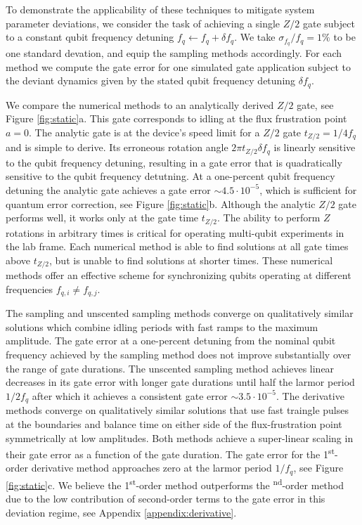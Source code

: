 To demonstrate the applicability of these techniques
to mitigate system parameter deviations,
we consider the task of achieving a single $Z/2$
gate subject to a constant qubit frequency detuning
$f_{q} \gets f_{q} + \delta f_{q}$.
We take $\sigma_{f_{q}} / f_{q} = 1\%$ to be one standard devation, and equip
the sampling methods accordingly. For each method we compute the gate error for
one simulated gate application subject to the deviant dynamics given by the
stated qubit frequency detuning $\delta f_{q}$.

We compare the numerical methods
to an analytically derived $Z/2$ gate, see Figure \ref{fig:static}a. This gate corresponds to
idling at the flux frustration point $a = 0$. The analytic gate
is at the device's speed limit for a $Z/2$ gate $t_{Z/2} = 1 / 4 f_{q}$ and
is simple to derive. Its erroneous rotation angle $2 \pi t_{Z/2} \delta f_{q}$ is linearly sensitive to
the qubit frequency detuning, resulting in a gate error that is quadratically sensitive
to the qubit frequency detutning.
At a one-percent
qubit frequency detuning the analytic gate achieves a gate error $\sim 4.5 \cdot 10^{-5}$,
which is sufficient for quantum error correction, see Figure \ref{fig:static}b.
Although the analytic $Z/2$ gate performs well, it works
only at the gate time $t_{Z/2}$. The ability to perform $Z$ rotations in arbitrary times is critical
for operating multi-qubit experiments in the lab frame.
Each numerical method is able to find solutions at
all gate times above $t_{Z/2}$, but is unable to find solutions at shorter times.
These numerical methods offer an effective scheme for synchronizing
qubits operating at different frequencies $f_{q, i} \neq f_{q, j}$.

The sampling and unscented sampling methods
converge on qualitatively similar solutions which combine idling periods
with fast ramps to the maximum amplitude. The gate error at a one-percent
detuning from the nominal qubit frequency achieved
by the sampling method does not improve substantially over the
range of gate durations. The unscented sampling method
achieves linear decreases in its gate error with longer gate durations
until half the larmor period $1 / 2 f_{q}$ after which it achieves a consistent
gate error $\sim 3.5 \cdot 10^{-5}$.
The derivative methods converge on qualitatively similar solutions that
use fast traingle pulses at the boundaries and balance time
on either side of the flux-frustration point symmetrically at low amplitudes.
Both methods achieve a super-linear scaling in their gate error as
a function of the gate duration. The gate error for the 1\textsuperscript{st}-order
derivative method approaches zero at the larmor period $1 / f_{q}$, see Figure \ref{fig:static}c.
We believe the 1\textsuperscript{st}-order method outperforms the \textsuperscript{nd}-order
method due to the low contribution of second-order
terms to the gate error in this deviation regime, see Appendix \ref{appendix:derivative}.



